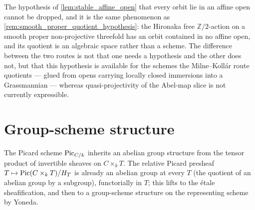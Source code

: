 \begin{remark}
  \label{rem:orbit_in_affine_hypothesis}
  The hypothesis of \cref{lem:stable_affine_open} that every orbit lie in an
  affine open cannot be dropped, and it is the same phenomenon as
  \cref{rem:smooth_proper_quotient_hypothesis}: the Hironaka free
  \(\mathbb{Z}/2\)-action on a smooth proper non-projective threefold has an
  orbit contained in no affine open, and its quotient is an algebraic space
  rather than a scheme. The difference between the two routes is not that one
  needs a hypothesis and the other does not, but that this hypothesis is
  available for the schemes the Milne--Koll\'ar route quotients --- glued from
  opens carrying locally closed immersions into a Grassmannian --- whereas
  quasi-projectivity of the Abel-map slice is not currently expressible.
\end{remark}

\section{Group-scheme structure}
\label{sec:fga_pic_group_structure}

The Picard scheme \(\operatorname{Pic}_{C/k}\) inherits an abelian group structure from
the tensor product of invertible sheaves on \(C \times_k T\). The relative
Picard presheaf \(T \mapsto \operatorname{Pic}(C \times_k T)/H_T\) is already an abelian
group at every \(T\) (the quotient of an abelian group by a subgroup),
functorially in \(T\); this lifts to the \'etale sheafification, and then
to a group-scheme structure on the representing scheme by Yoneda.


